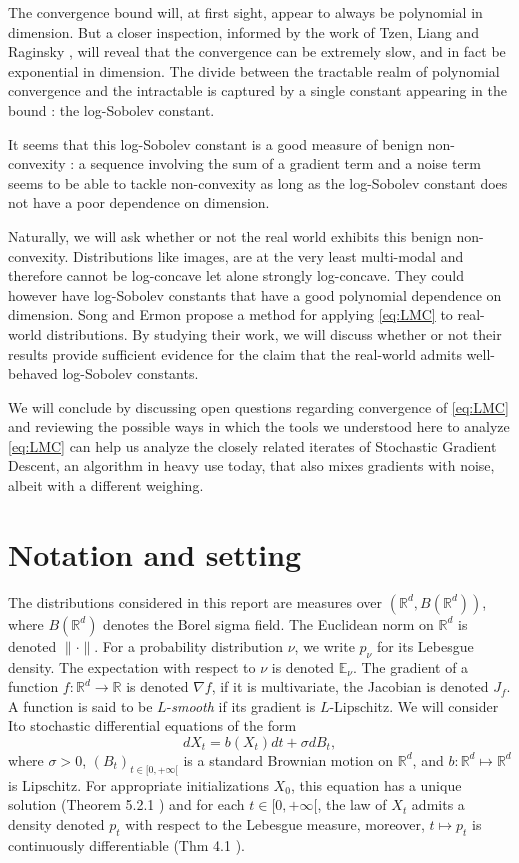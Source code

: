 \documentclass[10pt,journal,a4paper]{IEEEtran}
\theoremstyle{definition}
\newcommand{\E}{\mathbb{E}}
\newcommand{\R}{\mathbb{R}}
\begin{document}
The convergence bound will, at first sight, appear to always be polynomial in dimension. But a closer inspection, informed by the work of Tzen, Liang and Raginsky \cite{tzen_local_2018}, will reveal that the convergence can be extremely slow, and in fact be exponential in dimension. The divide between the tractable realm of polynomial convergence and the intractable is captured by a single constant appearing in the bound : the log-Sobolev constant. 

It seems that this log-Sobolev constant is a good measure of benign non-convexity \cite{cheng_sharp_2020, li_escape_2021, pillaud-vivien_statistical_2020}: a sequence involving the sum of a gradient term and a noise term seems to be able to tackle non-convexity as long as the log-Sobolev constant does not have a poor dependence on dimension.

Naturally, we will ask whether or not the real world exhibits this benign non-convexity. Distributions like images, are at the very least multi-modal and therefore cannot be log-concave let alone strongly log-concave. They could however have log-Sobolev constants that have a good polynomial dependence on dimension. Song and Ermon propose a method for applying \eqref{eq:LMC} to real-world distributions. By studying their work, we will discuss whether or not  their results provide sufficient evidence for the claim that the real-world admits well-behaved log-Sobolev constants.

We will conclude by discussing open questions regarding convergence of \eqref{eq:LMC} and reviewing the possible ways in which the tools we understood here to analyze \eqref{eq:LMC} can help us analyze the closely related iterates of Stochastic Gradient Descent, an algorithm in heavy use today, that also mixes gradients with noise, albeit with a different weighing.

\section{Notation and setting}

The distributions considered in this report are measures over $(\R^d, B(\R^d))$, where $B(\R^d)$ denotes the Borel sigma field. The Euclidean norm on $\R^d$ is denoted $\|\cdot\|$. For a probability distribution $\nu$, we write $p_\nu$ for its Lebesgue density. The expectation with respect to $\nu$ is denoted $\E_\nu$. The gradient of a function $f: \R^d \rightarrow \R$ is denoted $\nabla f$, if it is multivariate, the Jacobian is denoted $J_f$. A function is said to be $L$-\textit{smooth} if its gradient is $L$-Lipschitz. We will consider Ito stochastic differential equations of the form 
\[
dX_t =  b(X_t)dt + \sigma dB_t,
\]
where $\sigma > 0$, $(B_t)_{t\in [0, +\infty[}$ is a standard Brownian motion on $\R^d$, and $b: \R^d \mapsto \R^d$ is Lipschitz. For appropriate initializations $X_0$, this equation has a unique solution (Theorem 5.2.1 \cite{oksendal_stochastic_2003}) and for each $t\in [0, +\infty[$, the law of $X_t$ admits a density denoted $p_t$ with respect to the Lebesgue measure, moreover, $t \mapsto p_t$ is continuously differentiable (Thm 4.1 \cite{pavliotis_fokkerplanck_2014}). 
\end{document}
